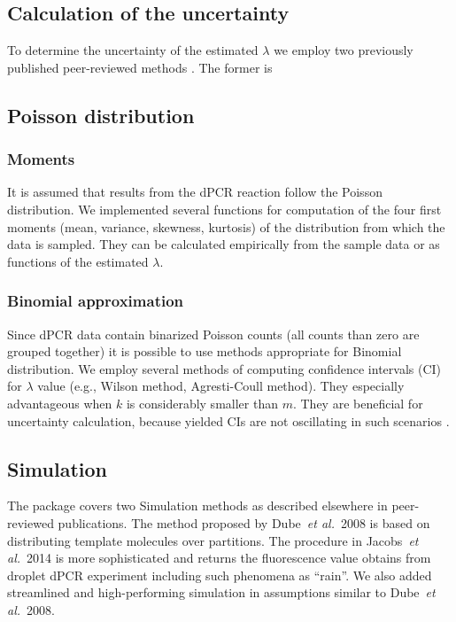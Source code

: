 \documentclass[a4,center,fleqn]{NAR}
\begin{document}
\subsection{Calculation of the uncertainty}

To determine the uncertainty of the estimated $\lambda$ we employ two 
previously 
published peer-reviewed methods \cite{dube_mathematical_2008, bhat_single_2009}.
The former is

\subsection{Poisson distribution}


\subsubsection{Moments}
It is assumed that results from the dPCR reaction follow the Poisson 
distribution. We implemented several functions for computation of the four 
first 
moments (mean, variance, skewness, kurtosis) of the distribution from which the 
data is sampled. They can be calculated empirically from the sample data or as 
functions of the estimated $\lambda$.

\subsubsection{Binomial approximation}
Since dPCR data contain binarized Poisson 
counts (all counts than zero are grouped together) it is possible to use 
methods 
appropriate for Binomial distribution. We employ several methods of computing 
confidence intervals (CI) for $\lambda$ value (e.g., Wilson method, 
Agresti-Coull method). They especially advantageous when $k$ is considerably 
smaller than $m$. They are beneficial for uncertainty calculation, because 
yielded CIs are not oscillating in such scenarios \cite{brown_2001}.

\subsection{Simulation}

The package covers two Simulation methods as described elsewhere in 
peer-reviewed publications. The method proposed by Dube~\textit{et al.}~2008 
\cite{dube_mathematical_2008} is based on distributing template molecules over 
partitions. The procedure in Jacobs~\textit{et al.}~2014 \cite{jacobs_2014} is 
more sophisticated and returns the fluorescence value obtains from droplet dPCR 
experiment including such phenomena as ``rain''. We also added streamlined and 
high-performing simulation in assumptions similar to Dube~\textit{et al.}~2008.
\end{document}
